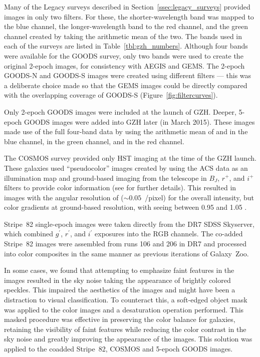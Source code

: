 \documentclass[twocolumn]{aastex6}
\begin{document}
Many of the Legacy surveys described in Section~\ref{ssec:legacy_surveys}
provided images in only two filters. For these, the shorter-wavelength band was
mapped to the blue channel, the longer-wavelength band to the red channel, and
the green channel created by taking the arithmetic mean of the two. The bands
used in each of the surveys are listed in Table~\ref{tbl:gzh_numbers}.
Although four bands were available for the GOODS survey, only two bands were
used to create the original 2-epoch images, for consistency with AEGIS and
GEMS. The 2-epoch GOODS-N and GOODS-S images were created using different
filters --- this was a deliberate choice made so that the GEMS images could be
directly compared with the overlapping coverage of GOODS-S
(Figure~\ref{fig:filtercurves}).

Only 2-epoch GOODS images were included at the launch of GZH.  Deeper, 5-epoch 
GOODS images were added into GZH later (in March 2015). These images made
use of the full four-band data by using the arithmetic mean of \Bband{} and
\Vband{} in the blue channel, \Iband{} in the green channel, and \zband{} in
the red channel.

The COSMOS survey provided only \Iband{} HST imaging at the time of the GZH
launch.  These galaxies used ``pseudocolor'' images created by using
the ACS \Iband{} data as an illumination map and ground-based imaging from the
\subaru{} telescope in $B_J$, $r^+$, and $i^+$ filters to provide color
information (see \citealt{gri12} for further details). This resulted in images
with the angular resolution of \hst{} ($\sim0.05$~\arcsec/pixel) for the
overall intensity, but color gradients at ground-based resolution, with seeing
between 0.95\arcsec{} and 1.05\arcsec{} \citep{tan07}.

Stripe~82 single-epoch images were taken directly from the DR7 SDSS Skyserver,
which combined $g^{\prime}$, $r^{\prime}$, and $i^{\prime}$ exposures into the
RGB channels. The co-added Stripe~82 images were assembled from runs 106 and
206 in DR7 and processed into color composites in the same manner as previous
iterations of Galaxy~Zoo.

In some cases, we found that attempting to emphasize faint features in the
images resulted in the sky noise taking the appearance of brightly colored
speckles. This impaired the aesthetics of the images and might have been a
distraction to visual classification.  To counteract this, a soft-edged object
mask was applied to the color images and a desaturation operation performed.
This masked procedure was effective in preserving the color balance for
galaxies, retaining the visibility of faint features while reducing the color
contrast in the sky noise and greatly improving the appearance of the images.
This solution was applied to the coadded Stripe~82, COSMOS and 5-epoch GOODS
images.
\end{document}
